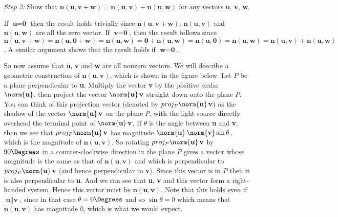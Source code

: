 \par\noindent \emph{Step 3:} Show that $\textbf{n}(\textbf{u},\textbf{v} + \textbf{w}) =
\textbf{n}(\textbf{u},\textbf{v}) + \textbf{n}(\textbf{u},\textbf{w})$ for any vectors \textbf{u}, \textbf{v},
\textbf{w}.\vspace{1mm}
\par\noindent If $\textbf{u} = \textbf{0}$ then the result holds trivially since $\textbf{n}(\textbf{u},\textbf{v} +
\textbf{w})$, $\textbf{n}(\textbf{u},\textbf{v})$ and $\textbf{n}(\textbf{u},\textbf{w})$ are all the zero vector. If
$\textbf{v} = \textbf{0}$, then the result follows since $\textbf{n}(\textbf{u},\textbf{v} + \textbf{w}) =
\textbf{n}(\textbf{u},\textbf{0} + \textbf{w}) = \textbf{n}(\textbf{u},\textbf{w}) = \textbf{0} +
\textbf{n}(\textbf{u},\textbf{w}) = \textbf{n}(\textbf{u},\textbf{0}) = \textbf{n}(\textbf{u},\textbf{w}) =
\textbf{n}(\textbf{u},\textbf{v}) + \textbf{n}(\textbf{u},\textbf{w})$. A similar argument shows that the result holds
if $\textbf{w} = \textbf{0}$.

So now assume that \textbf{u}, \textbf{v} and \textbf{w} are all nonzero vectors.
We will describe a geometric construction of $\textbf{n}(\textbf{u},\textbf{v})$, which is shown in the
figure below. Let $P$ be a plane perpendicular to \textbf{u}. Multiply the vector \textbf{v} by the positive
scalar $\norm{\textbf{u}}$, then project the vector $\norm{\textbf{u}}\,\textbf{v}$ straight down onto the plane $P$.
You can think of this projection vector (denoted by $proj_{P} \norm{\textbf{u}}\,\textbf{v}$) as the shadow of the
vector $\norm{\textbf{u}}\,\textbf{v}$ on the plane $P$, with the light source directly overhead the terminal point of
$\norm{\textbf{u}}\,\textbf{v}$. If $\theta$ is the angle between \textbf{u} and \textbf{v}, then we see that
$proj_{P} \norm{\textbf{u}}\,\textbf{v}$ has magnitude
$\norm{\textbf{u}}\,\norm{\textbf{v}} \sin \theta$, which is the magnitude of $\textbf{n}(\textbf{u},\textbf{v})$. So
rotating $proj_{P} \norm{\textbf{u}}\,\textbf{v}$ by $90\Degrees$ in a counter-clockwise direction in the plane $P$
gives a vector whose magnitude is the same as that of $\textbf{n}(\textbf{u},\textbf{v})$ and which is perpendicular to
$proj_{P} \norm{\textbf{u}}\,\textbf{v}$ (and hence perpendicular to \textbf{v}). Since this vector is in $P$ then it is
also perpendicular to \textbf{u}. And we can see that \textbf{u}, \textbf{v} and this vector form a right-handed system.
Hence this vector must be $\textbf{n}(\textbf{u},\textbf{v})$. Note that this holds even if $\textbf{u} \parallel
\textbf{v}$, since in that case $\theta = 0\Degrees$ and so $\sin \theta = 0$ which means that
$\textbf{n}(\textbf{u},\textbf{v})$ has magnitude $0$, which is what we would expect.

